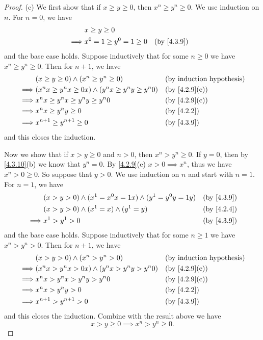 \begin{proof}{(c)}
	We first show that if \(x \geq y \geq 0\), then \(x^n \geq y^n \geq 0\).
	We use induction on \(n\).
	For \(n = 0\), we have
	\begin{align*}
		         & x \geq y \geq 0                             \\
		\implies & x^0 = 1 \geq y^0 = 1 \geq 0 &  & \by{4.3.9}
	\end{align*}
	and the base case holds.
	Suppose inductively that for some \(n \geq 0\) we have \(x^n \geq y^n \geq 0\).
	Then for \(n + 1\), we have
	\begin{align*}
		         & (x \geq y \geq 0) \land (x^n \geq y^n \geq 0)                  &  & \byIH                       \\
		\implies & (x^n x \geq y^n x \geq 0x) \land (y^n x \geq y^n y \geq y^n 0) &  & \text{(by \cref{4.2.9}(e))} \\
		\implies & x^n x \geq y^n x \geq y^n y \geq y^n 0                         &  & \text{(by \cref{4.2.9}(c))} \\
		\implies & x^n x \geq y^n y \geq 0                                        &  & \by{4.2.2}                  \\
		\implies & x^{n + 1} \geq y^{n + 1} \geq 0                                &  & \by{4.3.9}
	\end{align*}
	and this closes the induction.

	Now we show that if \(x > y \geq 0\) and \(n > 0\), then \(x^n > y^n \geq 0\).
	If \(y = 0\), then by \cref{4.3.10}(b) we know that \(y^n = 0\).
	By \cref{4.2.9}(e) \(x > 0 \implies x^n\), thus we have \(x^n > 0 \geq 0\).
	So suppose that \(y > 0\).
	We use induction on \(n\) and start with \(n = 1\).
	For \(n = 1\), we have
	\begin{align*}
		         & (x > y > 0) \land (x^1 = x^0 x = 1x) \land (y^1 = y^0 y = 1y) &  & \by{4.3.9} \\
		         & (x > y > 0) \land (x^1 = x) \land (y^1 = y)                   &  & \by{4.2.4} \\
		\implies & x^1 > y^1 > 0                                                 &  & \by{4.3.9}
	\end{align*}
	and the base case holds.
	Suppose inductively that for some \(n \geq 1\) we have \(x^n > y^n > 0\).
	Then for \(n + 1\), we have
	\begin{align*}
		         & (x > y > 0) \land (x^n > y^n > 0)                  &  & \byIH                       \\
		\implies & (x^n x > y^n x > 0x) \land (y^n x > y^n y > y^n 0) &  & \text{(by \cref{4.2.9}(e))} \\
		\implies & x^n x > y^n x > y^n y > y^n 0                      &  & \text{(by \cref{4.2.9}(c))} \\
		\implies & x^n x > y^n y > 0                                  &  & \by{4.2.2}                  \\
		\implies & x^{n + 1} > y^{n + 1} > 0                          &  & \by{4.3.9}
	\end{align*}
	and this closes the induction.
	Combine with the result above we have
	\[
		x > y \geq 0 \implies x^n > y^n \geq 0.
	\]
\end{proof}

